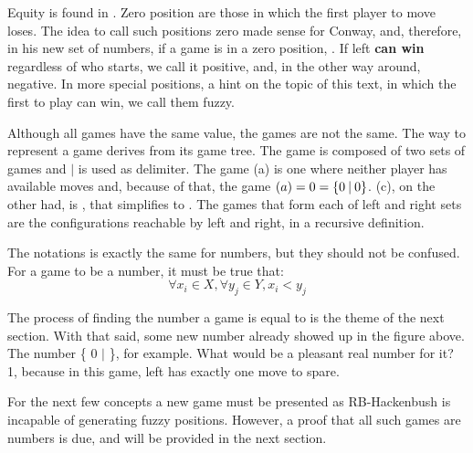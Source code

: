 Equity is found in . Zero position are those in which the first player to move loses. The idea to call such positions zero made sense for Conway, and, therefore, in his new set of numbers, if a game \Gm is in a zero position, . If left \textbf{can win} regardless of who starts, we call it positive, and, in the other way around, negative. In more special positions, a hint on the topic of this text, in which the first to play can win, we call them fuzzy.



Although all games have the same value, the games are not the same. The  way to represent a game derives from its game tree. The game is composed of two sets of games and $\mid$ is used as delimiter. The game (a) is one where neither player has available moves and, because of that, the game $(a) = 0 = \mbox{$\{0\:|\:0\}$}$. (c), on the other had, is \gam{\gam{}{\gam{}{}}}{\gam{\gam{}{}}{}}, that simplifies to . The games that form each of left and right sets are the configurations reachable by left and right, in a recursive definition.

The notations is exactly the same for numbers, but they should not be confused. For a game   to be a number, it must be true that:
$$\forall x_i \in X, \forall y_j \in Y, x_i < y_j$$

The process of finding the number a game is equal to is the theme of the next section. With that said, some new number already showed up in the figure above. The number \{ 0 $\mid$ \}, for example. What would be a pleasant real number for it? 1, because in this game, left has exactly one move to spare.

For the next few concepts a new game must be presented as RB-Hackenbush is incapable of generating fuzzy positions. However, a proof that all such games are numbers is due, and will be provided in the next section.

\begin{figure} [!ht]
	\begin{center}
	\end{center}
	\caption{}
\end{figure}

